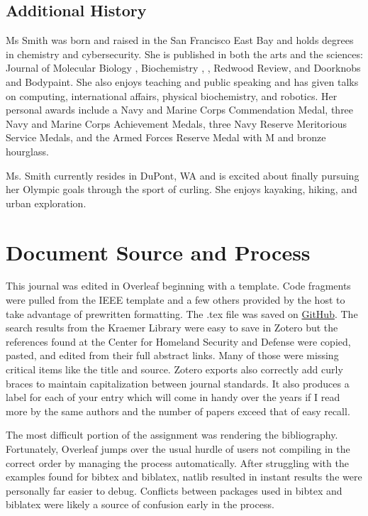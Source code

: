 \documentclass[journal]{IEEEtran}
\begin{document}
\subsection{Additional History}
Ms Smith was born and raised in the San Francisco East Bay and holds degrees in chemistry and cybersecurity. She is published in both the arts and the sciences: Journal of Molecular Biology \cite{JSmith3}, Biochemistry \cite{JSmith1}, \cite{JSmith2}, Redwood Review, and Doorknobs and Bodypaint. She also enjoys teaching and public speaking and has given talks on computing, international affairs, physical biochemistry, and robotics. Her personal awards include a Navy and Marine Corps Commendation Medal, three Navy and Marine Corps Achievement Medals, three Navy Reserve Meritorious Service Medals, and the Armed Forces Reserve Medal with M and bronze hourglass.

Ms. Smith currently resides in DuPont, WA and is excited about finally pursuing her Olympic goals through the sport of curling. She enjoys kayaking, hiking, and urban exploration.
\section{Document Source and Process}
This journal was edited in Overleaf beginning with a template. Code fragments were pulled from the IEEE template and a few others provided by the host to take advantage of prewritten formatting. The .tex file was saved on \href{https://github.com/morisey/UCCS/blob/master/Week 1 Journal}{GitHub}. The search results from the Kraemer Library were easy to save in Zotero but the references found at the Center for Homeland Security and Defense were copied, pasted, and edited from their full abstract links. Many of those were missing critical items like the title and source. Zotero exports also correctly add curly braces to maintain capitalization between journal standards. It also produces a label for each of your entry which will come in handy over the years if I read more by the same authors and the number of papers exceed that of easy recall.

The most difficult portion of the assignment was rendering the bibliography. Fortunately, Overleaf jumps over the usual hurdle of users not compiling in the correct order by managing the process automatically. After struggling with the examples found for bibtex and biblatex, natlib resulted in instant results the were personally far easier to debug. Conflicts between packages used in bibtex and biblatex were likely a source of confusion early in the process.
\end{document}
